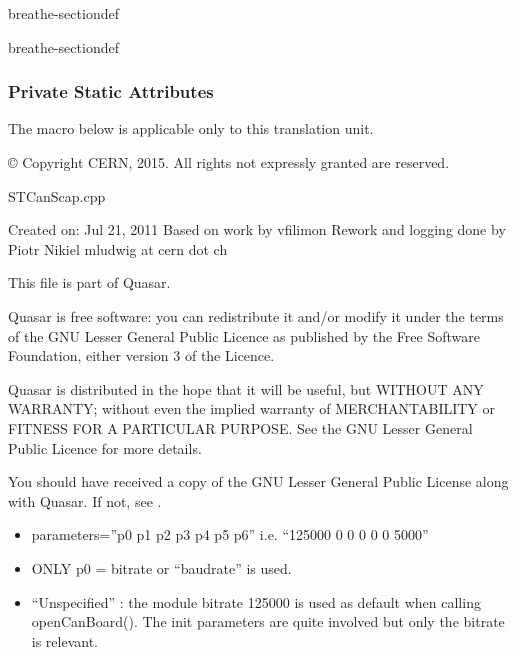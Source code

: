 \documentclass[a4paper,10pt,english]{sphinxmanual}
\begin{document}
\begin{fulllineitems}
\begin{sphinxuseclass}{breathe-sectiondef}
\begin{fulllineitems}
\end{fulllineitems}


\end{sphinxuseclass}
\begin{sphinxuseclass}{breathe-sectiondef}\subsubsection*{Private Static Attributes}


\begin{fulllineitems}
%
\pysigstartmultiline
{}%
\pysigstopmultiline
\sphinxAtStartPar
The macro below is applicable only to this translation unit. 

\sphinxAtStartPar
© Copyright CERN, 2015. All rights not expressly granted are reserved.

\sphinxAtStartPar
STCanScap.cpp

\sphinxAtStartPar
Created on: Jul 21, 2011 Based on work by vfilimon Rework and logging done by Piotr Nikiel  mludwig at cern dot ch

\sphinxAtStartPar
This file is part of Quasar.

\sphinxAtStartPar
Quasar is free software: you can redistribute it and/or modify it under the terms of the GNU Lesser General Public Licence as published by the Free Software Foundation, either version 3 of the Licence.

\sphinxAtStartPar
Quasar is distributed in the hope that it will be useful, but WITHOUT ANY WARRANTY; without even the implied warranty of MERCHANTABILITY or FITNESS FOR A PARTICULAR PURPOSE. See the GNU Lesser General Public Licence for more details.

\sphinxAtStartPar
You should have received a copy of the GNU Lesser General Public License along with Quasar. If not, see . 

\end{fulllineitems}


\end{sphinxuseclass}
\end{fulllineitems}

\begin{itemize}
\item {} 
\sphinxAtStartPar
parameters=”p0 p1 p2 p3 p4 p5 p6” i.e. “125000 0 0 0 0 0 5000”

\item {} 
\sphinxAtStartPar
ONLY p0 = bitrate or “baudrate” is used.

\item {} 
\sphinxAtStartPar
“Unspecified” : the module bitrate 125000 is used as default when calling openCanBoard(). The init parameters are quite involved but only the bitrate is relevant.

\end{itemize}
\end{document}

